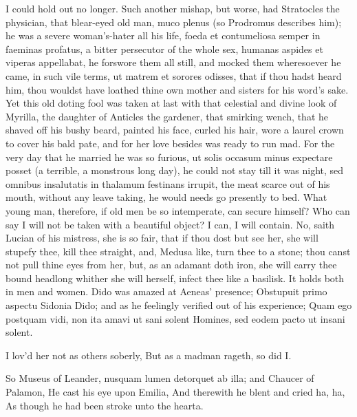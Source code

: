 {I could hold out no longer. Such another mishap, but worse, had
Stratocles the physician, that blear-eyed old man, muco plenus (so
Prodromus describes him); he was a severe woman's-hater all his
life, foeda et contumeliosa semper in faeminas profatus, a bitter
persecutor of the whole sex, humanas aspides et viperas appellabat, he
forswore them all still, and mocked them wheresoever he came, in such
vile terms, ut matrem et sorores odisses, that if thou hadst heard him,
thou wouldst have loathed thine own mother and sisters for his word's
sake. Yet this old doting fool was taken at last with that celestial
and divine look of Myrilla, the daughter of Anticles the gardener, that
smirking wench, that he shaved off his bushy beard, painted his face,
curled his hair, wore a laurel crown to cover his bald pate, and
for her love besides was ready to run mad. For the very day that he
married he was so furious, ut solis occasum minus expectare posset (a
terrible, a monstrous long day), he could not stay till it was night,
sed omnibus insalutatis in thalamum festinans irrupit, the meat scarce
out of his mouth, without any leave taking, he would needs go presently
to bed. What young man, therefore, if old men be so intemperate, can
secure himself? Who can say I will not be taken with a beautiful
object? I can, I will contain. No, saith Lucian of his mistress,
she is so fair, that if thou dost but see her, she will stupefy thee,
kill thee straight, and, Medusa like, turn thee to a stone; thou canst
not pull thine eyes from her, but, as an adamant doth iron, she will
carry thee bound headlong whither she will herself, infect thee like a
basilisk. It holds both in men and women. Dido was amazed at Aeneas'
presence; Obstupuit primo aspectu Sidonia Dido; and as he feelingly
verified out of his experience;
Quam ego postquam vidi, non ita amavi ut sani solent
Homines, sed eodem pacto ut insani solent.

I lov'd her not as others soberly,
But as a madman rageth, so did I.

So Museus of Leander, nusquam lumen detorquet ab illa; and
Chaucer of Palamon,
He cast his eye upon Emilia,
And therewith he blent and cried ha, ha,
As though he had been stroke unto the hearta.

}
